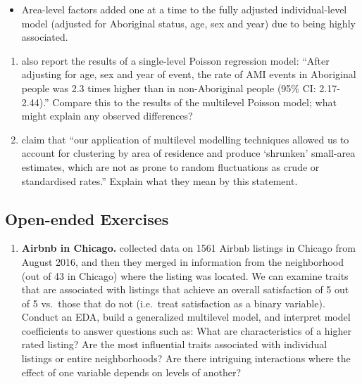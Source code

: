 \documentclass[
]{krantz}
\providecommand{\tightlist}{%
  \setlength{\itemsep}{0pt}\setlength{\parskip}{0pt}}
\begin{document}
\begin{itemize}
\tightlist
\item
  Area-level factors added one at a time to the fully adjusted individual-level model (adjusted for Aboriginal status, age, sex and year) due to being highly associated.
\end{itemize}

\begin{enumerate}
\def\labelenumi{\arabic{enumi}.}
\setcounter{enumi}{26}
\item
  \citet{Randall2014} also report the results of a single-level Poisson regression model: ``After adjusting for age, sex and year of event, the rate of AMI events in Aboriginal people was 2.3 times higher than in non-Aboriginal people (95\% CI: 2.17-2.44).'' Compare this to the results of the multilevel Poisson model; what might explain any observed differences?
\item
  \citet{Randall2014} claim that ``our application of multilevel modelling techniques allowed us to account for clustering by area of residence and produce `shrunken' small-area estimates, which are not as prone to random fluctuations as crude or standardised rates.'' Explain what they mean by this statement.
\end{enumerate}

\hypertarget{open-ended-exercises-5}{%
\subsection{Open-ended Exercises}\label{open-ended-exercises-5}}

\begin{enumerate}
\def\labelenumi{\arabic{enumi}.}
\tightlist
\item
  \textbf{Airbnb in Chicago.} \citet{Trinh2018} collected data on 1561 Airbnb listings in Chicago from August 2016, and then they merged in information from the neighborhood (out of 43 in Chicago) where the listing was located. We can examine traits that are associated with listings that achieve an overall satisfaction of 5 out of 5 vs.~those that do not (i.e.~treat satisfaction as a binary variable). Conduct an EDA, build a generalized multilevel model, and interpret model coefficients to answer questions such as: What are characteristics of a higher rated listing? Are the most influential traits associated with individual listings or entire neighborhoods? Are there intriguing interactions where the effect of one variable depends on levels of another?
\end{enumerate}
\end{document}
